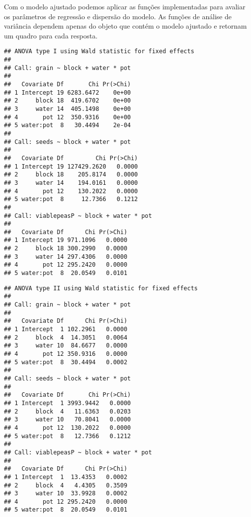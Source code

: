 Com o modelo ajustado podemos aplicar as funções implementadas para avaliar os parâmetros de regressão e dispersão do modelo. As funções de análise de variância dependem apenas do objeto que contém o modelo ajustado e retornam um quadro para cada resposta.


\begin{knitrout}
\color{fgcolor}\begin{kframe}
\begin{alltt}
\end{alltt}
\begin{verbatim}
## ANOVA type I using Wald statistic for fixed effects
## 
## Call: grain ~ block + water * pot
## 
##   Covariate Df       Chi Pr(>Chi)
## 1 Intercept 19 6283.6472    0e+00
## 2     block 18  419.6702    0e+00
## 3     water 14  405.1498    0e+00
## 4       pot 12  350.9316    0e+00
## 5 water:pot  8   30.4494    2e-04
## 
## Call: seeds ~ block + water * pot
## 
##   Covariate Df         Chi Pr(>Chi)
## 1 Intercept 19 127429.2620   0.0000
## 2     block 18    205.8174   0.0000
## 3     water 14    194.0161   0.0000
## 4       pot 12    130.2022   0.0000
## 5 water:pot  8     12.7366   0.1212
## 
## Call: viablepeasP ~ block + water * pot
## 
##   Covariate Df      Chi Pr(>Chi)
## 1 Intercept 19 971.1096   0.0000
## 2     block 18 300.2990   0.0000
## 3     water 14 297.4306   0.0000
## 4       pot 12 295.2420   0.0000
## 5 water:pot  8  20.0549   0.0101
\end{verbatim}
\end{kframe}
\end{knitrout}


\begin{knitrout}
\color{fgcolor}\begin{kframe}
\begin{alltt}
\end{alltt}
\begin{verbatim}
## ANOVA type II using Wald statistic for fixed effects
## 
## Call: grain ~ block + water * pot
## 
##   Covariate Df      Chi Pr(>Chi)
## 1 Intercept  1 102.2961   0.0000
## 2     block  4  14.3051   0.0064
## 3     water 10  84.6677   0.0000
## 4       pot 12 350.9316   0.0000
## 5 water:pot  8  30.4494   0.0002
## 
## Call: seeds ~ block + water * pot
## 
##   Covariate Df       Chi Pr(>Chi)
## 1 Intercept  1 3993.9442   0.0000
## 2     block  4   11.6363   0.0203
## 3     water 10   70.8041   0.0000
## 4       pot 12  130.2022   0.0000
## 5 water:pot  8   12.7366   0.1212
## 
## Call: viablepeasP ~ block + water * pot
## 
##   Covariate Df      Chi Pr(>Chi)
## 1 Intercept  1  13.4353   0.0002
## 2     block  4   4.4305   0.3509
## 3     water 10  33.9928   0.0002
## 4       pot 12 295.2420   0.0000
## 5 water:pot  8  20.0549   0.0101
\end{verbatim}
\end{kframe}
\end{knitrout}

